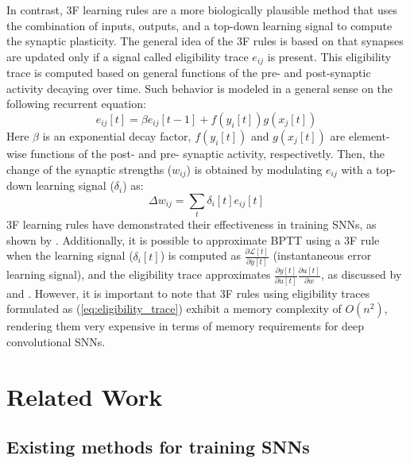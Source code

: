 \documentclass[10pt]{article} %
\begin{document}
    In contrast, 3F learning rules \citep{Gerstner2018EligibilityRules} are a more biologically plausible method that uses the combination of inputs, outputs, and a top-down learning signal to compute the synaptic plasticity.
    The general idea of the 3F rules is based on that synapses are updated only if a signal called eligibility trace $e_{ij}$ is present. 
    This eligibility trace is computed based on general functions of the pre- and post-synaptic activity decaying over time.
    Such behavior is modeled in a general sense on the following recurrent equation: 
    \begin{equation}
    \label{eq:eligibility_trace}
    e_{ij}[t] = \beta e_{ij}[t-1] + f(y_i[t])g(x_j[t])
    \end{equation}
    Here $\beta$ is an exponential decay factor, $f(y_i[t])$ and $g(x_j[t])$ are element-wise functions of the post- and pre- synaptic activity, respectivetly. 
    Then, the change of the synaptic strengths ($w_{ij}$) is obtained by modulating $e_{ij}$ with a top-down learning signal ($\delta_i$) as:
    \begin{equation}
    \label{eq:3f_rule}
    \Delta w_{ij} = \sum_{t} \delta_i[t]e_{ij}[t]
    \end{equation}
    3F learning rules have demonstrated their effectiveness in training SNNs, as shown by \cite{Bellec2020ANeurons}. 
    Additionally, it is possible to approximate BPTT using a 3F rule when the learning signal ($\delta_i[t]$) is computed as $\frac{\partial\mathcal{L}[t]}{\partial y[t]}$ (instantaneous error learning signal), and the eligibility trace approximates $\frac{\partial y[t]}{\partial u[t]} \frac{\partial u[t]}{\partial w}$, as discussed by \cite{Bellec2020ANeurons} and \cite{Martin-Sanchez2022ARules}. 
    However, it is important to note that 3F rules using eligibility traces formulated as (\ref{eq:eligibility_trace}) exhibit a memory complexity of $O(n^2)$, rendering them very expensive in terms of memory requirements for deep convolutional SNNs.
    
    
\section{Related Work}\label{sec:related_works}
    
    \subsection{Existing methods for training SNNs}\label{sec:existing_methods}
    
\end{document}
